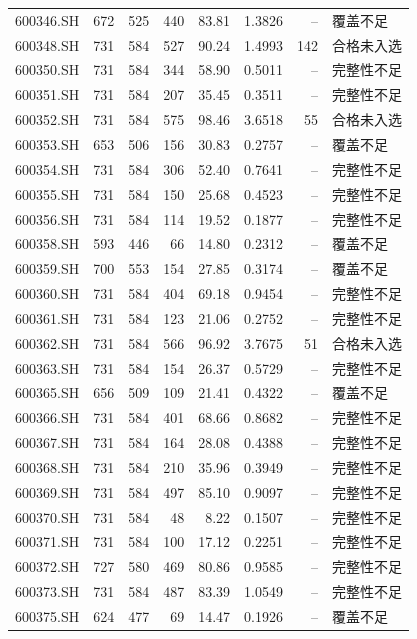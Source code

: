\documentclass[10pt,a4paper]{article}
\begin{document}
\begin{longtable}{lrrr r r r l}
600346.SH & 672 & 525 & 440 & 83.81 & 1.3826 & -- & 覆盖不足\\
600348.SH & 731 & 584 & 527 & 90.24 & 1.4993 & 142 & 合格未入选\\
600350.SH & 731 & 584 & 344 & 58.90 & 0.5011 & -- & 完整性不足\\
600351.SH & 731 & 584 & 207 & 35.45 & 0.3511 & -- & 完整性不足\\
600352.SH & 731 & 584 & 575 & 98.46 & 3.6518 & 55 & 合格未入选\\
600353.SH & 653 & 506 & 156 & 30.83 & 0.2757 & -- & 覆盖不足\\
600354.SH & 731 & 584 & 306 & 52.40 & 0.7641 & -- & 完整性不足\\
600355.SH & 731 & 584 & 150 & 25.68 & 0.4523 & -- & 完整性不足\\
600356.SH & 731 & 584 & 114 & 19.52 & 0.1877 & -- & 完整性不足\\
600358.SH & 593 & 446 & 66 & 14.80 & 0.2312 & -- & 覆盖不足\\
600359.SH & 700 & 553 & 154 & 27.85 & 0.3174 & -- & 覆盖不足\\
600360.SH & 731 & 584 & 404 & 69.18 & 0.9454 & -- & 完整性不足\\
600361.SH & 731 & 584 & 123 & 21.06 & 0.2752 & -- & 完整性不足\\
600362.SH & 731 & 584 & 566 & 96.92 & 3.7675 & 51 & 合格未入选\\
600363.SH & 731 & 584 & 154 & 26.37 & 0.5729 & -- & 完整性不足\\
600365.SH & 656 & 509 & 109 & 21.41 & 0.4322 & -- & 覆盖不足\\
600366.SH & 731 & 584 & 401 & 68.66 & 0.8682 & -- & 完整性不足\\
600367.SH & 731 & 584 & 164 & 28.08 & 0.4388 & -- & 完整性不足\\
600368.SH & 731 & 584 & 210 & 35.96 & 0.3949 & -- & 完整性不足\\
600369.SH & 731 & 584 & 497 & 85.10 & 0.9097 & -- & 完整性不足\\
600370.SH & 731 & 584 & 48 & 8.22 & 0.1507 & -- & 完整性不足\\
600371.SH & 731 & 584 & 100 & 17.12 & 0.2251 & -- & 完整性不足\\
600372.SH & 727 & 580 & 469 & 80.86 & 0.9585 & -- & 完整性不足\\
600373.SH & 731 & 584 & 487 & 83.39 & 1.0549 & -- & 完整性不足\\
600375.SH & 624 & 477 & 69 & 14.47 & 0.1926 & -- & 覆盖不足\\

\end{longtable}
\end{document}
